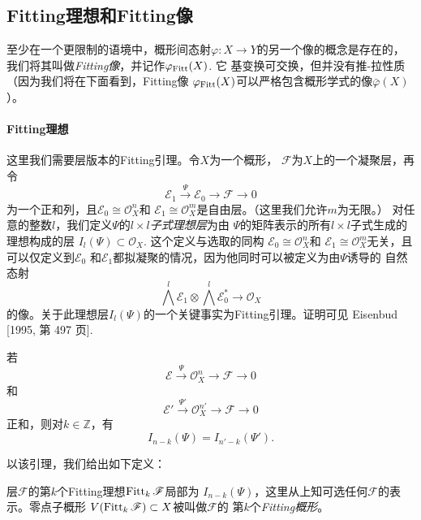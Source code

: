 \subsection{Fitting理想和Fitting像}\label{s:5.1.3}

至少在一个更限制的语境中，概形间态射$\varphi:X\to Y$的另一个像的概念是存在的，
我们将其叫做\textit{Fitting像}，并记作$\varphi_{\operatorname{Fitt}}(X)$. 它
基变换可交换，但并没有推-拉性质（因为我们将在下面看到，Fitting像
$\varphi_{\operatorname{Fitt}}(X)$可以严格包含概形学式的像$\bar\varphi(X)$）。

\paragraph*{Fitting理想} 这里我们需要层版本的Fitting引理。令$X$为一个概形，
$\mathscr F$为$X$上的一个凝聚层，再令
\[
    \mathscr{E}_1 \stackrel{\Psi}{\longrightarrow} \mathscr{E}_0 \longrightarrow \mathscr{F} \longrightarrow 0
\]
为一个正和列，且$\mathscr E_0\cong \mathscr O_X^n$和
$\mathscr{E}_1 \cong \mathscr{O}_X^m$是自由层。（这里我们允许$m$为无限。）
对任意的整数$l$，我们定义$\Psi$的\textit{$l\times l$子式理想层}为由
$\Psi$的矩阵表示的所有$l\times l$子式生成的理想构成的层
$I_l(\Psi)\subset \mathscr O_X$. 这个定义与选取的同构
$\mathscr E_0\cong \mathscr O_X^n$和
$\mathscr{E}_1 \cong \mathscr{O}_X^m$无关，且可以仅定义到$\mathscr{E}_0$
和$\mathscr{E}_1$都拟凝聚的情况，因为他同时可以被定义为由$\Psi$诱导的
自然态射
\[
    \bigwedge^l \mathscr{E}_1 \otimes \bigwedge^l \mathscr{E}_0^* \longrightarrow \mathscr{O}_X
\]
的像。关于此理想层$I_l(\Psi)$的一个关键事实为Fitting引理。证明可见
Eisenbud [1995, 第 497 页].

\begin{lem}[Fitting引理]\label{lem:5.9}
若
\[
    \mathscr{E} \stackrel{\Psi}{\longrightarrow} \mathscr{O}_X^n \longrightarrow \mathscr{F} \longrightarrow 0
\]
和
\[
    \mathscr{E}' \stackrel{\Psi'}{\longrightarrow} \mathscr{O}_X^{n'} \longrightarrow \mathscr{F} \longrightarrow 0
\]
正和，则对$k\in \mathbb Z$，有
\[
    I_{n-k}(\Psi)=I_{n'-k}(\Psi').
\]
\end{lem}

以该引理，我们给出如下定义：

\begin{defi}\label{defi:5.10}
    层$\mathscr F$的第$k$个Fitting理想$\operatorname{Fitt}_k\mathscr F$局部为
    $I_{n-k}(\Psi)$，这里从上知可选任何$\mathscr F$的表示。零点子概形
    $V(\operatorname{Fitt}_k\mathscr F)\subset X$被叫做$\mathscr F$的
    第$k$个\textit{Fitting概形}。
\end{defi}


